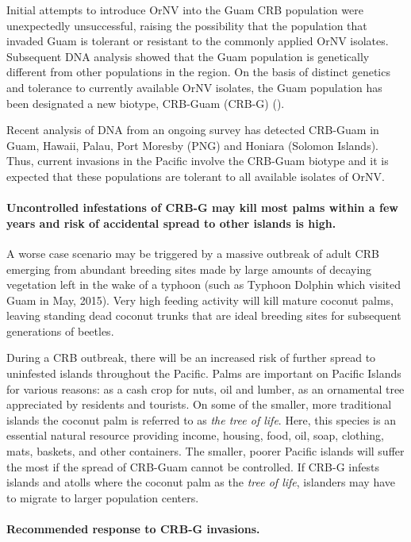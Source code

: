 \documentclass[12pt,letterpaper,english,bibliography=totocnumbered, abstract=on]{scrartcl}
\begin{document}
Initial attempts to introduce OrNV into the Guam CRB population were
unexpectedly unsuccessful, raising the possibility that the population
that invaded Guam is tolerant or resistant to the commonly applied
OrNV isolates. Subsequent DNA analysis showed that the Guam population
is genetically different from other populations in the region. On
the basis of distinct genetics and tolerance to currently available
OrNV isolates, the Guam population has been designated a new biotype,
CRB-Guam (CRB-G) (\cite{marshall_new_2015,marshall_new_2017-1}).

Recent analysis of DNA from an ongoing survey has detected CRB-Guam
in Guam, Hawaii, Palau, Port Moresby (PNG) and Honiara (Solomon Islands).
Thus, current invasions in the Pacific involve the CRB-Guam biotype
and it is expected that these populations are tolerant to all available
isolates of OrNV. 

\paragraph*{Uncontrolled infestations of CRB-G may kill most palms within a few
years and risk of accidental spread to other islands is high.}

A worse case scenario may be triggered by a massive outbreak of adult
CRB emerging from abundant breeding sites made by large amounts of
decaying vegetation left in the wake of a typhoon (such as Typhoon
Dolphin which visited Guam in May, 2015). Very high feeding activity
will kill mature coconut palms, leaving standing dead coconut trunks
that are ideal breeding sites for subsequent generations of beetles. 

During a CRB outbreak, there will be an increased risk of further
spread to uninfested islands throughout the Pacific. Palms are important
on Pacific Islands for various reasons: as a cash crop for nuts, oil
and lumber, as an ornamental tree appreciated by residents and tourists.
On some of the smaller, more traditional islands the coconut palm
is referred to as \emph{the tree of life}. Here, this species is an
essential natural resource providing income, housing, food, oil, soap,
clothing, mats, baskets, and other containers. The smaller, poorer
Pacific islands will suffer the most if the spread of CRB-Guam cannot
be controlled. If CRB-G infests islands and atolls where the coconut
palm as the \emph{tree of life}, islanders may have to migrate to
larger population centers.

\paragraph*{Recommended response to CRB-G invasions.}
\end{document}
